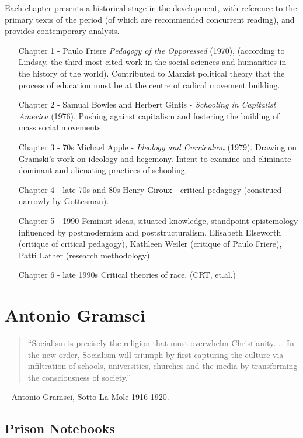 \documentclass[10pt,titlepage]{book}
\begin{document}
Each chapter presents a historical stage in the development, with reference to the primary texts of the period (of which are recommended concurrent reading), and provides contemporary analysis.

\begin{itemize}
\item [Chapter 1 -]
  Paulo Friere \emph{Pedagogy of the Opporessed} (1970), (according to Lindsay, the third most-cited work in the social sciences and humanities in the history of the world).
  Contributed to Marxist political theory that the process of education must be at the centre of radical movement building.
\item [Chapter 2 -]
  Samual Bowles and Herbert Gintis - \emph{Schooling in Capitalist America} (1976).
  Pushing against capitalism and fostering the building of mass social movements.
\item [Chapter 3 - 70s]
  Michael Apple - \emph{Ideology and Curriculum} (1979).  Drawing on Gramski's work on ideology and hegemony.
  Intent to examine and eliminate dominant and alienating practices of schooling.
\item [Chapter 4 - late 70s and 80s]
  Henry Giroux - critical pedagogy (construed narrowly by Gottesman).
\item [Chapter 5 - \~1990]
  Feminist ideas, situated knowledge, standpoint epistemology influenced by postmodernism and poststructuralism.
  Elisabeth Elseworth (critique of critical pedagogy), Kathleen Weiler (critique of Paulo Friere), Patti Lather (research methodology).
\item [Chapter 6 - late 1990s]
  Critical theories of race. (CRT, et.al.)
\end{itemize}

\pagebreak

\section{Antonio Gramsci}

\begin{quotation}“Socialism is precisely the religion that must overwhelm Christianity. … In the new order, Socialism will triumph by first capturing the culture via infiltration of schools, universities, churches and the media by transforming the consciousness of society.”
  \end{quotation}
~ Antonio Gramsci, Sotto La Mole 1916-1920.

\subsection{Prison Notebooks \cite{gramsci-notes}}
\end{document}
